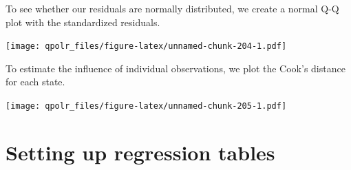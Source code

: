 \documentclass[12pt,oneside]{reedthesis}
\theoremstyle{definition}
\theoremstyle{definition}
\theoremstyle{definition}
\theoremstyle{remark}
\begin{document}
  To see whether our residuals are normally distributed, we create a
  normal Q-Q plot with the standardized residuals.
  \begin{Shaded}
  \begin{Highlighting}[]
  \OperatorTok{+}
  \StringTok{  }\NormalTok{(}\NormalTok{(}\OperatorTok{+}
  \StringTok{  }\NormalTok{() }\OperatorTok{+}
  \StringTok{  }\NormalTok{(} \NormalTok{,}
          \NormalTok{,}
          \NormalTok{)}
  \end{Highlighting}
  \end{Shaded}
  \texttt{[image: qpolr\_files/figure-latex/unnamed-chunk-204-1.pdf]}
  
  To estimate the influence of individual observations, we plot the Cook's
  distance for each state.
  \begin{Shaded}
  \begin{Highlighting}[]
  \NormalTok{(} \OperatorTok{+}
  \StringTok{  }\NormalTok{()  }\OperatorTok{+}
  \StringTok{  }\NormalTok{(} \NormalTok{,}
          \NormalTok{,}
          \NormalTok{)}
  \end{Highlighting}
  \end{Shaded}
  \texttt{[image: qpolr\_files/figure-latex/unnamed-chunk-205-1.pdf]}
  
  \section{Setting up regression
  tables}\label{setting-up-regression-tables}
  
\end{document}
